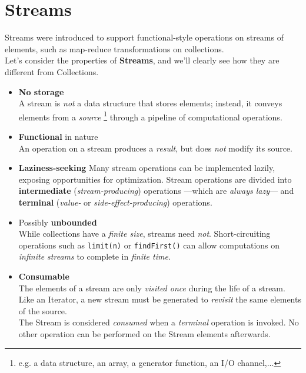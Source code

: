 \chapter{Streams}

Streams were introduced to support functional-style operations on streams of elements, such as map-reduce transformations on collections.\\
Let's consider the properties of \textbf{Streams}, and we'll clearly see how they are different from Collections.
\begin{itemize}
   \item \textbf{No storage}\\
   A stream is \textit{not} a data structure that
   stores elements; instead, it conveys elements
   from a \textit{source} \footnote{e.g. a data structure, an array, a
   generator function, an I/O channel,...} through a pipeline of computational operations.
   \item \textbf{Functional} in nature\\
   An operation on a stream produces a \textit{result}, but does \textit{not} modify its source.
   \item \textbf{Laziness-seeking}
   Many stream operations can be
   implemented lazily, exposing opportunities for optimization.
   Stream operations are divided into \textbf{intermediate} 
   (\textit{stream-producing}) operations {---}which are \textit{always lazy}{---} and
   \textbf{terminal}
   (\textit{value- }or \textit{side-effect-producing}) operations.
   \item Possibly \textbf{unbounded}\\
   While collections have a \textit{finite size}, streams need \textit{not}.
   Short-circuiting operations such as \lstinline|limit(n)| or
   \lstinline|findFirst()| can allow computations on \textit{infinite streams} to
   complete in \textit{finite time}.
   \item \textbf{Consumable}\\
   The elements of a stream are only \textit{visited once}
   during the life of a stream. 
   Like an Iterator, a new stream must be generated to \textit{revisit} the same elements of the source.\\
   The Stream is considered \textit{consumed} when a \textit{terminal}
   operation is invoked. 
   No other operation can be performed on
   the Stream elements afterwards.
\end{itemize} 
